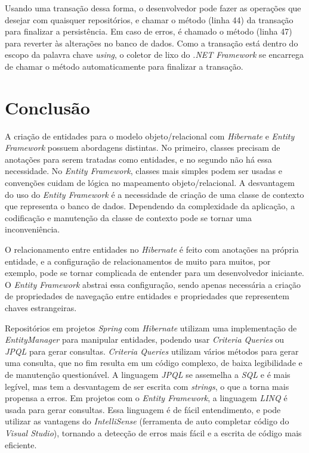 Usando uma transação dessa forma, o desenvolvedor pode fazer as operações que desejar com quaisquer repositórios, e chamar o método  (linha 44) da transação para finalizar a persistência. Em caso de erros, é chamado o método  (linha 47) para reverter às alterações no banco de dados. Como a transação está dentro do escopo da palavra chave \textit{using}, o coletor de lixo do \textit{.NET Framework} se encarrega de chamar o método  automaticamente para finalizar a transação.


\section{Conclusão}

A criação de entidades para o modelo objeto/relacional com \textit{Hibernate} e \textit{Entity Framework} possuem abordagens distintas. No primeiro, classes precisam de anotações para serem tratadas como entidades, e no segundo não há essa necessidade. No \textit{Entity Framework}, classes mais simples podem ser usadas e convenções cuidam de lógica no mapeamento objeto/relacional. A desvantagem do uso do \textit{Entity Framework} é a necessidade de criação de uma classe de contexto que representa o banco de dados. Dependendo da complexidade da aplicação, a codificação e manutenção da classe de contexto pode se tornar uma inconveniência.

O relacionamento entre entidades no \textit{Hibernate} é feito com anotações na própria entidade, e a configuração de relacionamentos de muito para muitos, por exemplo, pode se tornar complicada de entender para um desenvolvedor iniciante. O \textit{Entity Framework} abstrai essa configuração, sendo apenas necessária a criação de propriedades de navegação entre entidades e propriedades que representem chaves estrangeiras.

Repositórios em projetos \textit{Spring} com \textit{Hibernate} utilizam uma implementação de \textit{EntityManager} para manipular entidades, podendo usar \textit{Criteria Queries} ou \textit{JPQL} para gerar consultas. \textit{Criteria Queries} utilizam vários métodos para gerar uma consulta, que no fim resulta em um código complexo, de baixa legibilidade e de manutenção questionável. A linguagem \textit{JPQL} se assemelha a \textit{SQL} e é mais legível, mas tem a desvantagem de ser escrita com \textit{strings}, o que a torna mais propensa a erros. Em projetos com o \textit{Entity Framework}, a linguagem \textit{LINQ} é usada para gerar consultas. Essa linguagem é de fácil entendimento, e pode utilizar as vantagens do \textit{IntelliSense} (ferramenta de auto completar código do \textit{Visual Studio}), tornando a detecção de erros mais fácil e a escrita de código mais eficiente.

